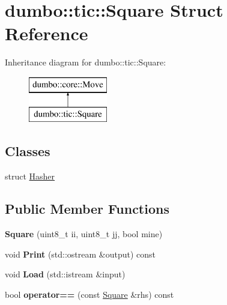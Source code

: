 \hypertarget{structdumbo_1_1tic_1_1_square}{\section{dumbo\-:\-:tic\-:\-:Square Struct Reference}
\label{structdumbo_1_1tic_1_1_square}
}
Inheritance diagram for dumbo\-:\-:tic\-:\-:Square\-:\begin{figure}[H]
\begin{center}
\leavevmode
\includegraphics[height=2.000000cm]{structdumbo_1_1tic_1_1_square}
\end{center}
\end{figure}
\subsection*{Classes}
\begin{DoxyCompactItemize}
\item 
struct \hyperlink{structdumbo_1_1tic_1_1_square_1_1_hasher}{Hasher}
\end{DoxyCompactItemize}
\subsection*{Public Member Functions}
\begin{DoxyCompactItemize}
\item 
\hypertarget{structdumbo_1_1tic_1_1_square_ac6108c970f1a1967ecda40cf472493c3}{{\bfseries Square} (uint8\-\_\-t ii, uint8\-\_\-t jj, bool mine)}\label{structdumbo_1_1tic_1_1_square_ac6108c970f1a1967ecda40cf472493c3}

\item 
\hypertarget{structdumbo_1_1tic_1_1_square_aab8f80567a53c2c536115bcba0b0b6d2}{void {\bfseries Print} (std\-::ostream \&output) const }\label{structdumbo_1_1tic_1_1_square_aab8f80567a53c2c536115bcba0b0b6d2}

\item 
\hypertarget{structdumbo_1_1tic_1_1_square_a8677374ea58bcaf6968eed4146296a5b}{void {\bfseries Load} (std\-::istream \&input)}\label{structdumbo_1_1tic_1_1_square_a8677374ea58bcaf6968eed4146296a5b}

\item 
\hypertarget{structdumbo_1_1tic_1_1_square_a04ab41c06f16d672c03d8be122f3816d}{bool {\bfseries operator==} (const \hyperlink{structdumbo_1_1tic_1_1_square}{Square} \&rhs) const }\label{structdumbo_1_1tic_1_1_square_a04ab41c06f16d672c03d8be122f3816d}

\end{DoxyCompactItemize}
